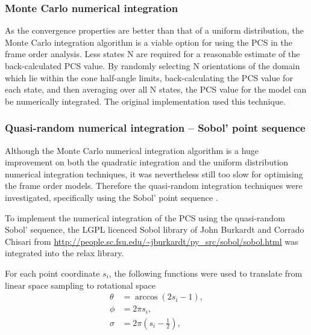 
\subsubsection{Monte Carlo numerical integration}

As the convergence properties are better than that of a uniform distribution, the Monte Carlo integration algorithm is a viable option for using the PCS in the frame order analysis.
Less states N are required for a reasonable estimate of the back-calculated PCS value.
By randomly selecting N orientations of the domain which lie within the cone half-angle limits, back-calculating the PCS value for each state, and then averaging over all N states, the PCS value for the model can be numerically integrated.
The original implementation used this technique.




\subsubsection{Quasi-random numerical integration -- Sobol' point sequence}

Although the Monte Carlo numerical integration algorithm is a huge improvement on both the quadratic integration and the uniform distribution numerical integration techniques, it was nevertheless still too slow for optimising the frame order models.
Therefore the quasi-random integration techniques were investigated, specifically using the Sobol' point sequence \citep{Sobol67}.

To implement the numerical integration of the PCS using the quasi-random Sobol' sequence, the LGPL licenced Sobol library of John Burkardt and Corrado Chisari from \url{http://people.sc.fsu.edu/~jburkardt/py_src/sobol/sobol.html} was integrated into the relax library.

For each point coordinate $s_i$, the following functions were used to translate from linear space sampling to rotational space
\begin{subequations}
\begin{align}
    \theta &= \arccos(2s_i - 1), \\
    \phi   &= 2 \pi s_i, \\
    \sigma &= 2 \pi (s_i - \tfrac{1}{2}),
\end{align}
\end{subequations}

